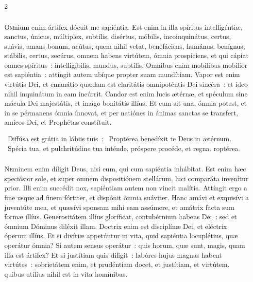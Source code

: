 \documentclass[9pt,twoside]{extarticle}
\begin{document}
\begin{multicols}{2}
{\subsubsection*{\center {}}
\lettrine{O}mnium enim ártifex dócuit me sapiéntia. Est enim in illa spíritus intelligéntiæ, sanctus, únicus, múltiplex, subtílis, disértus, móbilis, incoinquinátus, certus, suávis, amans bonum, acútus, quem nihil vetat, benefáciens, humánus, benígnus, stábilis, certus, secúrus, omnem habens virtútem, ómnia prospíciens, et qui cápiat omnes spíritus~: intelligíbilis, mundus, subtílis. Omnibus enim mobílibus mobílior est sapiéntia~: attíngit autem ubíque propter suam mundítiam. Vapor est enim virtútis Dei, et emanátio quædam est claritátis omnipoténtis Dei sincéra~: et ídeo nihil inquinátum in eam incúrrit. Candor est enim lucis ætérnæ, et spéculum sine mácula Dei majestátis, et imágo bonitátis illíus. Et cum sit una, ómnia potest, et in se pérmanens ómnia ínnovat, et per natiónes in ánimas sanctas se transfert, amícos Dei, et Prophétas constítuit.

\begin{tightlist}{}
\item {}~Diffúsa est grátia in lábiis tuis~: \textred{*}~Proptérea benedíxit te Deus in ætérnum. ~Spécia tua, et pulchritúdine tua inténde, próspere procéde, et regna. roptérea.
\end{tightlist}

\subsubsection*{\center {}}
\lettrine{N}eminem enim díligit Deus, nisi eum, qui cum sapiéntia inhábitat. Est enim hæc speciósior sole, et super omnem dispositiónem stellárum, luci comparáta invenítur prior. Illi enim succédit nox, sapiéntiam autem non vincit malítia. Attíngit ergo a fine usque ad finem fórtiter, et dispónit ómnia suáviter. Hanc amávi et exquisívi a juventúte mea, et quæsívi sponsam mihi eam assúmere, et amátrix facta sum formæ illíus. Generositátem illíus gloríficat, contubérnium habens Dei~: sed et ómnium Dóminus diléxit illam. Doctrix enim est disciplínæ Dei, et eléctrix óperum illíus. Et si divítiæ appetúntur in vita, quid sapiéntia locuplétius, quæ operátur ómnia? Si autem sensus operátur~: quis horum, quæ sunt, magis, quam illa est ártifex? Et si justítiam quis díligit~: labóres hujus magnas habent virtútes~: sobrietátem enim, et prudéntiam docet, et justítiam, et virtútem, quibus utílius nihil est in vita homínibus.

}
\end{multicols}
\end{document}
